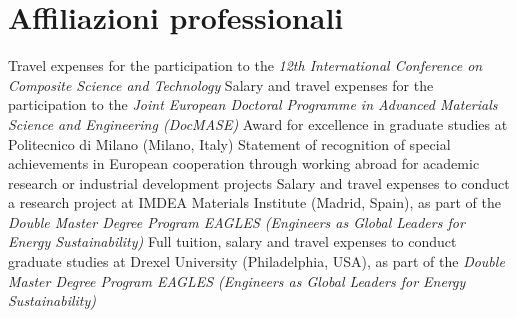 \documentclass[
  a4paper, 
]{fortysecondscv}
\begin{document}
\section{Affiliazioni professionali}
\begin{cvtable}
\end{cvtable}

\newpage
\makethirdsidebar

\begin{cvtable}
		{{\small Travel expenses for the participation to the \emph{\small 12th International Conference on Composite Science and Technology}}}
		{{\small Salary and travel expenses for the participation to the \emph{\small Joint European Doctoral Programme in Advanced Materials Science and Engineering (DocMASE)}}}
		{{\small Award for excellence in graduate studies at Politecnico di Milano (Milano, Italy)}}
		{{\small Statement of recognition of special achievements in European cooperation through working abroad for academic research or industrial development projects}}
		{{\small Salary and travel expenses to conduct a research project at IMDEA Materials Institute (Madrid, Spain), as part of the \emph{\small Double Master Degree Program EAGLES (Engineers as Global Leaders for Energy Sustainability)}}}
		{{\small Full tuition, salary and travel expenses to conduct graduate studies at Drexel University (Philadelphia, USA), as part of the \emph{\small Double Master Degree Program EAGLES (Engineers as Global Leaders for Energy Sustainability)}}}

\end{cvtable}
\end{document}
